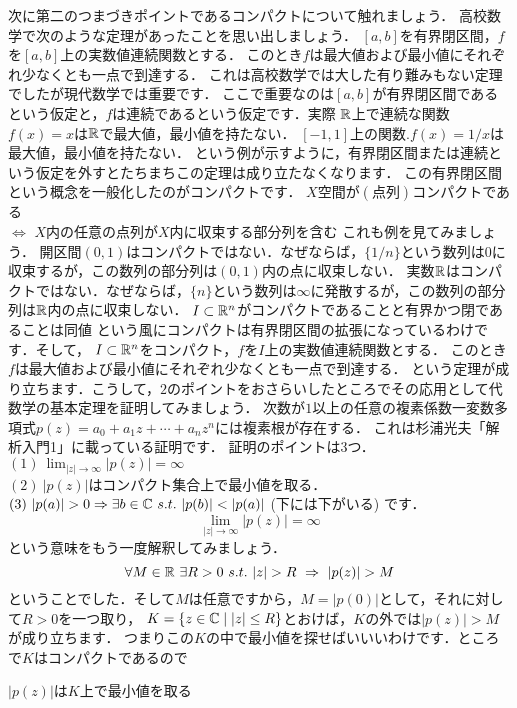 次に第二のつまづきポイントであるコンパクトについて触れましょう．
高校数学で次のような定理があったことを思い出しましょう．
\thm[最大値最小値の定理]
$[a,b]$を有界閉区間，$f$を$[a,b]$上の実数値連続関数とする．
このとき$f$は最大値および最小値にそれぞれ少なくとも一点で到達する．
\thmx
これは高校数学では大した有り難みもない定理でしたが現代数学では重要です．
ここで重要なのは$[a,b]$が有界閉区間であるという仮定と，$f$は連続であるという仮定です．実際
\ex[非有界]
$\mathbb R$上で連続な関数$f(x)=x$は$\mathbb R$で最大値，最小値を持たない．
\exx
\ex[不連続]
$[-1,1]$上の関数.$f(x)=1/x$は最大値，最小値を持たない．
\exx
という例が示すように，有界閉区間または連続という仮定を外すとたちまちこの定理は成り立たなくなります．
この有界閉区間という概念を一般化したのがコンパクトです．
$X$空間が$(点列)$コンパクトである\\
$\iff$
$X$内の任意の点列が$X$内に収束する部分列を含む
これも例を見てみましょう．
\ex
開区間$(0,1)$はコンパクトではない．なぜならば，$\{1/n\}$という数列は$0$に収束するが，この数列の部分列は$(0,1)$内の点に収束しない．
\exx
\ex
実数$\mathbb R$はコンパクトではない．なぜならば，$\{n\}$という数列は$\infty$に発散するが，この数列の部分列は$\mathbb R$内の点に収束しない．
\exx
\thm
$I \subset \mathbb R^n$がコンパクトであることと有界かつ閉であることは同値
\thmx
という風にコンパクトは有界閉区間の拡張になっているわけです．そして，
\thm
$I \subset \mathbb R^n$をコンパクト，$f$を$I$上の実数値連続関数とする．
このとき$f$は最大値および最小値にそれぞれ少なくとも一点で到達する．
\thmx
という定理が成り立ちます．こうして，$2$のポイントをおさらいしたところでその応用として代数学の基本定理を証明してみましょう．
\thm[代数学の基本定理]
次数が$1$以上の任意の複素係数一変数多項式$p(z)=a_0+a_1 z+\cdots + a_nz^n$には複素根が存在する．
\thmx
\proof[初等解析による証明]
これは杉浦光夫「解析入門1」に載っている証明です．
証明のポイントは3つ．\\
$(1)\ \lim_{|z|\to\infty}|p(z)| = \infty$\\
$(2)\ |p(z)|$はコンパクト集合上で最小値を取る．\\
$(3)\ |p(a)|>0 \Rightarrow \exists b \in \C \ s.t. \ |p(b)| < |p(a)|$ (下には下がいる)
です．
\[
\lim_{|z|\to\infty}|p(z)| = \infty
\]
という意味をもう一度解釈してみましょう．
\[
\forall M \in \R \ \exists R>0 \ s.t. \  |z| > R \ \Rightarrow\  |p(z)|>M
\]
ということでした．そして$M$は任意ですから，$M=|p(0)|$として，それに対して$R>0$を一つ取り，
$K=\{ z\in\mathbb C \mid |z|\le R\}$とおけば，$K$の外では$|p(z)|>M$が成り立ちます．
つまりこの$K$の中で最小値を探せばいいいわけです．ところで$K$はコンパクトであるので
\begin{center}
$|p(z)|$は$K$上で最小値を取る
\end{center}
